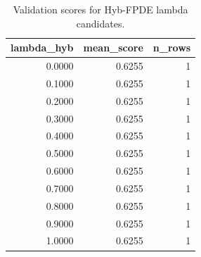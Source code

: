 \begin{table}[t]
\caption{Validation scores for Hyb-FPDE lambda candidates.}
\label{tab:lambda_distribution_computed}
\centering
\begin{tabular}{rrr}
\toprule
lambda\_hyb & mean\_score & n\_rows \\
\midrule
0.0000 & 0.6255 & 1 \\
0.1000 & 0.6255 & 1 \\
0.2000 & 0.6255 & 1 \\
0.3000 & 0.6255 & 1 \\
0.4000 & 0.6255 & 1 \\
0.5000 & 0.6255 & 1 \\
0.6000 & 0.6255 & 1 \\
0.7000 & 0.6255 & 1 \\
0.8000 & 0.6255 & 1 \\
0.9000 & 0.6255 & 1 \\
1.0000 & 0.6255 & 1 \\
\bottomrule
\end{tabular}

\end{table}
